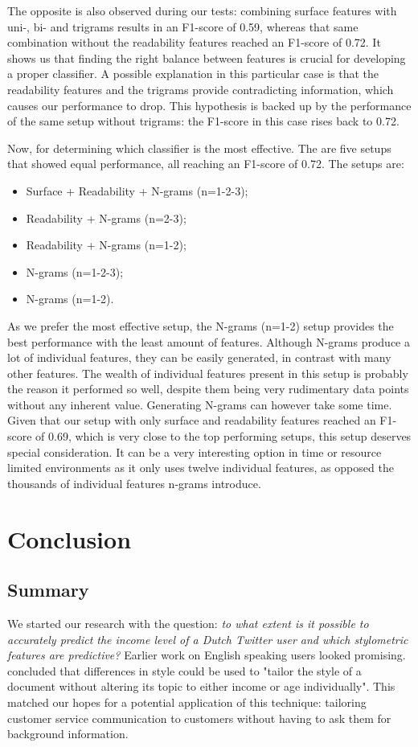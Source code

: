 \documentclass[
10pt, %
a4paper, %
oneside, %
headinclude,footinclude, %
] {book}%
\begin{document}
The opposite is also observed during our tests: combining surface features with uni-, bi- and trigrams results in an F1-score of 0.59, whereas that same combination without the readability features reached an F1-score of 0.72. It shows us that finding the right balance between features is crucial for developing a proper classifier. A possible explanation in this particular case is that the readability features and the trigrams provide contradicting information, which causes our performance to drop. This hypothesis is backed up by the performance of the same setup without trigrams: the F1-score in this case rises back to 0.72.

Now, for determining which classifier is the most effective. The are five setups that showed equal performance, all reaching an F1-score of 0.72. The setups are:
\begin{itemize}
\item Surface + Readability + N-grams (n=1-2-3);
\item Readability + N-grams (n=2-3);
\item Readability + N-grams (n=1-2);
\item N-grams (n=1-2-3);
\item N-grams (n=1-2).
\end{itemize}

As we prefer the most effective setup, the N-grams (n=1-2) setup provides the best performance with the least amount of features. Although N-grams produce a lot of individual features, they can be easily generated, in contrast with many other features. The wealth of individual features present in this setup is probably the reason it performed so well, despite them being very rudimentary data points without any inherent value.
Generating N-grams can however take some time. Given that our setup with only surface and readability features reached an F1-score of 0.69, which is very close to the top performing setups, this setup deserves special consideration. It can be a very interesting option in time or resource limited environments as it only uses twelve individual features, as opposed the thousands of individual features n-grams introduce.



\chapter{Conclusion}
\label{conclusion}
\section{Summary}
We started our research with the question: \textit{to what extent is it possible to accurately predict the income level of a Dutch Twitter user and which stylometric features are predictive?} Earlier work on English speaking users looked promising. \citet{flekova} concluded that differences in style could be used to "tailor the style of a document without altering its topic to either income or age individually". This matched our hopes for a potential application of this technique: tailoring customer service communication to customers without having to ask them for background information.
\end{document}
